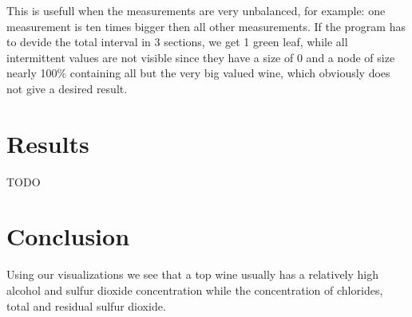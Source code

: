 \documentclass[a4paper,twoside,11pt]{article}
\begin{document}
This is usefull when the measurements are very unbalanced, for example: one measurement is ten times bigger then all other measurements. If the program has to devide the total interval in 3 sections, we get 1 green leaf, while all intermittent values are not visible since they have a size of 0 and a node of size nearly 100\% containing all but the very big valued wine, which obviously does not give a desired result.

\section{Results}
TODO

\section{Conclusion}
Using our visualizations we see that a top wine usually has a relatively high alcohol and sulfur dioxide concentration while the concentration of chlorides, total and residual sulfur dioxide.
\end{document}
